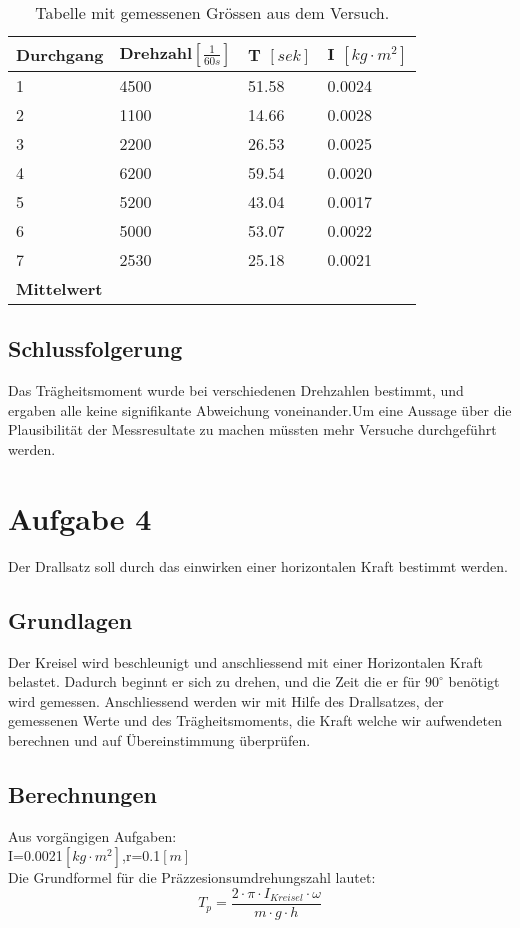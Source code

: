 \documentclass{article}
\begin{document}
\begin{table}[H]
   \center
    \begin{tabular}{|l|l|l|l|}
        \hline
        Durchgang & Drehzahl$[\frac{1}{60s}]$ & T $[sek]$    & I  $[kg\cdot m^2]$    \\ \hline
        1         & 4500     & 51.58 & 0.0024 \\ 
        2         & 1100     & 14.66 & 0.0028 \\ 
        3         & 2200     & 26.53 & 0.0025 \\ 
        4         & 6200     & 59.54 & 0.0020 \\ 
        5         & 5200     & 43.04 & 0.0017 \\ 
        6         & 5000     & 53.07 & 0.0022 \\ 
        7         & 2530     & 25.18 & 0.0021 \\ \hline
        \textbf{Mittelwert}&&&\textbf{}\\
        \hline
    \end{tabular}
    \caption{Tabelle mit gemessenen Grössen aus dem Versuch.}
\end{table}
\subsection{Schlussfolgerung}
Das Trägheitsmoment wurde bei verschiedenen Drehzahlen bestimmt, und ergaben alle keine signifikante Abweichung voneinander.Um eine Aussage über die Plausibilität der Messresultate zu machen müssten mehr Versuche durchgeführt werden.
\section{Aufgabe 4}
Der Drallsatz soll durch das einwirken einer horizontalen Kraft bestimmt werden.
\subsection{Grundlagen}
Der Kreisel wird beschleunigt und anschliessend mit einer Horizontalen Kraft belastet. Dadurch beginnt er sich zu drehen, und die Zeit die er für $90^\circ$ benötigt wird gemessen. Anschliessend werden wir mit Hilfe des Drallsatzes, der gemessenen Werte und des Trägheitsmoments, die Kraft welche wir aufwendeten berechnen und auf Übereinstimmung überprüfen.

\subsection{Berechnungen}
Aus vorgängigen Aufgaben:\\
I=0.0021$[kg\cdot m^2]$,r=0.1$[m]$\vspace{0.2cm}\\ 
Die Grundformel für die Präzzesionsumdrehungszahl lautet:
\begin{equation}
T_p = \frac{2\cdot\pi\cdot I_{Kreisel}\cdot \omega}{m\cdot g\cdot h}
\end{equation}
\end{document}
